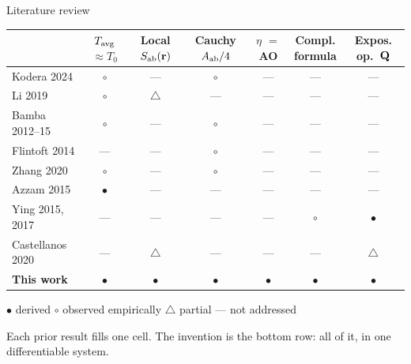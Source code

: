 \documentclass[aspectratio=169, 10pt]{beamer}
\begin{document}
\begin{frame}[t]{Literature review}
  \begin{center}\small
  \begin{tabular}{l cccccc}
    \toprule
    & \makecell{$\Tavg$\\[-2pt]${\approx}T_0$}
    & \makecell{Local\\[-2pt]$S_{\mathrm{ab}}(\mathbf{r})$}
    & \makecell{Cauchy\\[-2pt]$A_{\mathrm{ab}}/4$}
    & \makecell{$\eta$\\[-2pt]$=$ AO}
    & \makecell{Compl.\\[-2pt]formula}
    & \makecell{Expos.\\[-2pt]op.\ $\mathbf{Q}$} \\
    \midrule
    Kodera 2024      & $\circ$    & ---         & $\circ$ & ---   & ---     & --- \\
    Li 2019          & $\circ$    & $\triangle$ & ---     & ---   & ---     & --- \\
    Bamba 2012--15   & $\circ$    & ---         & $\circ$ & ---   & ---     & --- \\
    Flintoft 2014    & ---        & ---         & $\circ$ & ---   & ---     & --- \\
    Zhang 2020       & $\circ$    & ---         & $\circ$ & ---   & ---     & --- \\
    Azzam 2015       & $\bullet$  & ---         & ---     & ---   & ---     & --- \\
    Ying 2015, 2017  & ---        & ---         & ---     & ---   & $\circ$ & $\bullet$ \\
    Castellanos 2020 & ---        & $\triangle$ & ---     & ---   & ---     & $\triangle$ \\
    \midrule
    \textbf{This work} & $\bullet$ & $\bullet$ & $\bullet$ & $\bullet$ & $\bullet$ & $\bullet$ \\
    \bottomrule
  \end{tabular}
  \end{center}

  \vspace{5pt}
  {\footnotesize $\bullet$ derived \quad $\circ$ observed empirically \quad $\triangle$ partial \quad --- not addressed}

  \vspace{3pt}
  \begin{resultbox}\centering
    Each prior result fills one cell. The invention is the bottom row: all of it, in one differentiable system.
  \end{resultbox}
\end{frame}
\end{document}
